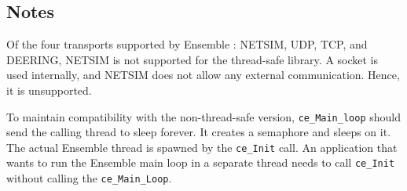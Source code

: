 \subsection{Notes}
Of the four transports supported by Ensemble : NETSIM, UDP, TCP, and
DEERING, NETSIM is not supported for the thread-safe library. A socket
is used internally, and NETSIM does not allow any
external communication. Hence, it is unsupported.

To maintain compatibility with the non-thread-safe version,
{\tt ce\_Main\_loop} should send the calling thread to sleep forever. It
creates a semaphore and sleeps on it. The actual Ensemble thread is
spawned by the {\tt ce\_Init} call. An application that wants to run
the Ensemble main loop in a separate thread needs to call
{\tt ce\_Init} without calling the {\tt ce\_Main\_Loop}.




